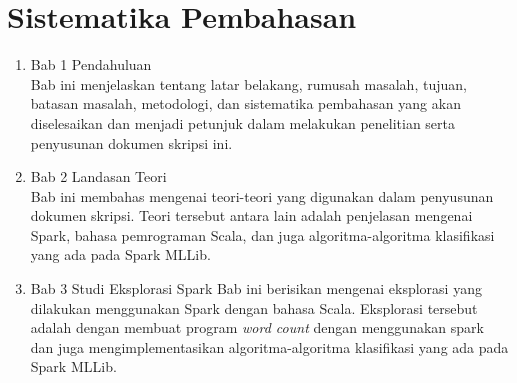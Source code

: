 \section{Sistematika Pembahasan}
\label{sec:sispem}
\begin{enumerate}
\item Bab 1 Pendahuluan\\
Bab ini menjelaskan tentang latar belakang, rumusah masalah, tujuan, batasan masalah, metodologi, dan sistematika pembahasan yang akan diselesaikan dan menjadi petunjuk dalam melakukan penelitian serta penyusunan dokumen skripsi ini.
\item Bab 2 Landasan Teori\\
Bab ini membahas mengenai teori-teori yang digunakan dalam penyusunan dokumen skripsi. Teori tersebut antara lain adalah penjelasan mengenai Spark, bahasa pemrograman Scala, dan juga algoritma-algoritma klasifikasi yang ada pada Spark MLLib.
\item Bab 3 Studi Eksplorasi Spark
Bab ini berisikan mengenai eksplorasi yang dilakukan menggunakan Spark dengan bahasa Scala. Eksplorasi tersebut adalah dengan membuat program \textit{word count} dengan menggunakan spark dan juga mengimplementasikan algoritma-algoritma klasifikasi yang ada pada Spark MLLib.
\end{enumerate}